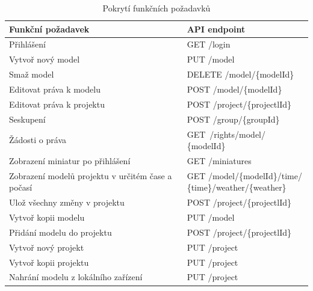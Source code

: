 \documentclass[thesis=B,czech]{FITthesis}[2012/06/26]
\begin{document}
        \begin{table}[h!]
        	\caption{Pokrytí funkčních požadavků} \label{tabulkaPokryti}
        	\begin{tabular}{| p{6cm} | p{5cm} |}\hline
        		Funkční požadavek & API endpoint
        		\tabularnewline \hline \hline
                Přihlášení & GET /login
            	\tabularnewline \hline
                Vytvoř nový model &	PUT /model
            	\tabularnewline \hline
                Smaž model &	DELETE /model/\{modelId\}
            	\tabularnewline \hline
                Editovat práva k modelu &	POST /model/\{modelId\}
            	\tabularnewline \hline
                Editovat práva k projektu &	POST /project/\{projectlId\}
            	\tabularnewline \hline
                Seskupení & POST /group/\{groupId\}
            	\tabularnewline \hline
                Žádosti o práva & GET~/rights/model/ \{modelId\}
            	\tabularnewline \hline
                Zobrazení miniatur po přihlášení & GET /miniatures
            	\tabularnewline \hline
                Zobrazení modelů projektu v určitém čase a počasí &
                \parbox[t]{5cm}{GET /model/\{modelId\}/time/\\\{time\}/weather/\{weather\}}
            	\tabularnewline \hline
                Ulož všechny změny v projektu &	POST /project/\{projectlId\}
            	\tabularnewline \hline
                Vytvoř kopii modelu	& PUT /model
            	\tabularnewline \hline
                Přidání modelu do projektu & POST /project/\{projectlId\}
            	\tabularnewline \hline
                Vytvoř nový projekt & PUT /project
            	\tabularnewline \hline
                Vytvoř kopii projektu &	PUT /project
            	\tabularnewline \hline
                Nahrání modelu z lokálního zařízení & PUT /project
            	\tabularnewline \hline
            \end{tabular}
        \end{table}
    \newpage
\end{document}
